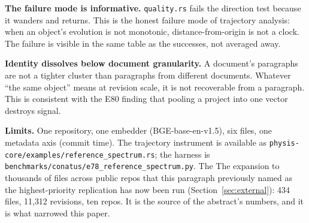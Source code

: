 \documentclass[11pt]{article}
\begin{document}
\textbf{The failure mode is informative.} \texttt{quality.rs} fails the
direction test because it wanders and returns. This is the honest failure
mode of trajectory analysis: when an object's evolution is not monotonic,
distance-from-origin is not a clock. The failure is visible in the same
table as the successes, not averaged away.

\textbf{Identity dissolves below document granularity.} A document's
paragraphs are not a tighter cluster than paragraphs from different
documents. Whatever ``the same object'' means at revision scale, it is not
recoverable from a paragraph. This is consistent with the E80 finding that
pooling a project into one vector destroys signal.

\textbf{Limits.} One repository, one embedder (BGE-base-en-v1.5), six
files, one metadata axis (commit time). The trajectory instrument is
available as \texttt{physis-core/examples/reference\_spectrum.rs}; the
harness is \texttt{benchmarks/conatus/e78\_reference\_spectrum.py}. The
The expansion to thousands of files across public repos that this paragraph
previously named as the highest-priority replication has now been run
(Section~\ref{sec:external}): 434 files, 11{,}312 revisions, ten repos. It is
the source of the abstract's numbers, and it is what narrowed this paper.
\end{document}
